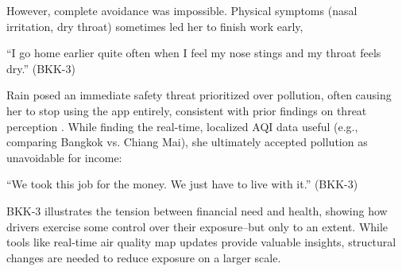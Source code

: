 However, complete avoidance was impossible. Physical symptoms (nasal irritation, dry throat) sometimes led her to finish work early,

\begin{quoteb}
    ``I go home earlier quite often when I feel my nose stings and my throat feels dry.'' (BKK-3)
\end{quoteb}  



Rain posed an immediate safety threat prioritized over pollution, often causing her to stop using the app entirely, consistent with prior findings on threat perception \cite{tieanklin2024rideshare}.
While finding the real-time, localized AQI data useful (e.g., comparing Bangkok vs. Chiang Mai), she ultimately accepted pollution as unavoidable for income:

\begin{quoteb}
    ``We took this job for the money. We just have to live with it.'' (BKK-3)
\end{quoteb}  


BKK-3 illustrates the tension between financial need and health,
showing how drivers exercise some control over their exposure--but only to an extent. 
While tools like real-time air quality map updates provide valuable insights, structural changes are needed to reduce exposure on a larger scale.  

